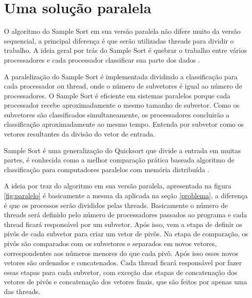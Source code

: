 \documentclass[journal]{IEEEtran}
\begin{document}
\section{Uma solução paralela}

O algoritmo do Sample Sort em sua versão paralela não difere muito da versão sequencial, a principal diferença é que serão utilizadas threads para dividir o trabalho. A ideia geral por trás do Sample Sort é quebrar o trabalho entre vários processadores e cada processador classificar sua parte dos dados \cite{berlim}. 

A paralelização do Sample Sort é implementada dividindo a classificação para cada processador ou thread, onde o número de subvetores é igual ao número de processadores. O Sample Sort é eficiente em sistemas paralelos porque cada processador recebe aproximadamente o mesmo tamanho de subvetor. Como os subvetores são classificados simultaneamente, os processadores concluirão a classificação aproximadamente ao mesmo tempo. Entenda por subvetor como os vetores resultantes da divisão do vetor de entrada. 

Sample Sort é uma generalização do Quicksort que divide a entrada em muitas partes, é conhecida como a melhor comparação prática baseada algoritmo de classificação para computadores paralelos com memória distribuída \cite{sanders}.




A ideia por traz do algoritmo em sua versão paralela, apresentada na figura \ref{fig:paralelo} é basicamente a mesma da aplicada na seção \ref{problema}, a diferença é que os processos serão divididos pelas threads. Basicamente o número de threads será definido pelo número de processadores passados ao programa e cada thread ficará responsável por um subvetor. Após isso, vem a etapa de definir os pivôs de cada subvetor para criar um vetor de pivôs. Na etapa de comparação, os pivôs são comparados com os subvetores e separados em novos vetores, correspondentes aos números menores do que cada pivô. Após isso esses novos vetores são ordenados e concatenados. Cada thread ficará responsável por fazer essas etapas para cada subvetor, com exceção das  etapas de concatenação dos vetores de pivôs e concatenação dos vetores finais, que são feitos por apenas uma das threads.
\end{document}
